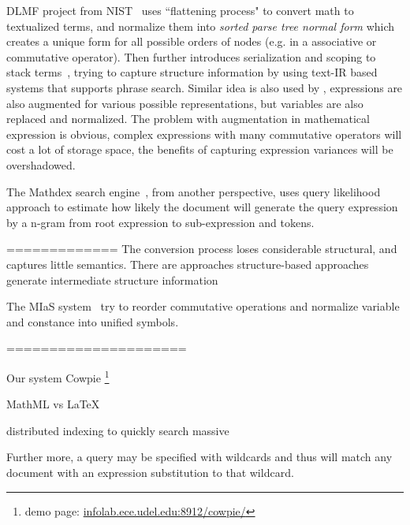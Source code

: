 DLMF project from NIST~\cite{Youssef03} uses ``flattening process" to convert math to textualized terms, and normalize them into \textit{sorted parse tree normal form} which creates a unique form for all possible orders of nodes (e.g. in a associative or commutative operator). 
Then further introduces serialization and scoping to stack terms~\cite{Youssef05}, trying to capture structure information by using text-IR based systems that supports phrase search. 
Similar idea is also used by \cite{extending08}, expressions are also augmented for various possible representations, but variables are also replaced and normalized. 
The problem with augmentation in mathematical expression is obvious, complex expressions with many commutative operators will cost a lot of storage space, the benefits of capturing expression variances will be overshadowed.

The Mathdex search engine~\cite{queryf_datan07}, from another perspective, uses query likelihood approach to estimate how likely the document will generate the query expression by a n-gram from root expression to sub-expression and tokens.


=============
The conversion process loses considerable structural, and captures little semantics. There are approaches structure-based approaches~\cite{WikiMirs13} generate intermediate structure information

The MIaS system~\cite{mias11} try to reorder commutative operations and normalize variable and constance into unified symbols. 

=====================

Our system Cowpie \footnote{demo page: \url{infolab.ece.udel.edu:8912/cowpie/}} \cite{WolframAlpha}

MathML vs LaTeX

distributed indexing to quickly search massive

Further more, a query may be specified with wildcards and thus will match any document with an expression substitution to that wildcard. 
